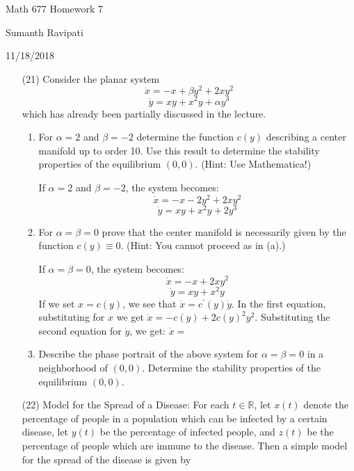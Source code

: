 \documentclass[12pt,letterpaper,reqno]{amsart}
\newcommand{\R}{\mathbb R}
\begin{document}
\thispagestyle{empty}
\centerline{\Large Math 677 Homework 7}
\centerline{Sumanth Ravipati}
\centerline{11/18/2018}
\vspace{.25in}

\begin{enumerate}
\item[(21)] Consider the planar system
$$\dot{x} = -x + \beta y^2 + 2xy^2$$
$$\dot{y} = xy + x^2y + \alpha y^3$$
which has already been partially discussed in the lecture.

\begin{enumerate}
    \item For $\alpha = 2$ and $\beta = -2$ determine the function $c(y)$ describing a center manifold up to order 10. Use this result to determine the stability properties of the equilibrium $(0,0)$. (Hint: Use Mathematica!)
    \newline
    \begin{flushleft}
    If $\alpha = 2$ and $\beta = -2$, the system becomes: $$\dot{x} = -x - 2y^2 + 2xy^2$$
    $$\dot{y} = xy + x^2y + 2y^3$$
    \newline
    \end{flushleft}
    \item For $\alpha = \beta = 0$ prove that the center manifold is necessarily given by the function $c(y) \equiv 0$. (Hint: You cannot proceed as in (a).)
    \begin{flushleft}
    If $\alpha = \beta = 0$, the system becomes:
    $$\dot{x} = -x + 2xy^2$$
    $$\dot{y} = xy + x^2y$$
    If we set $x = c(y)$, we see that $\dot{x} = c^\prime(y)\dot{y}$. In the first equation, substituting for $x$ we get $\dot{x} = -c(y) + 2c(y)^2y^2$. Substituting the second equation for $\dot{y}$, we get: $\dot{x} = $
    \newline
    \end{flushleft}
    \item Describe the phase portrait of the above system for $\alpha = \beta = 0$ in a neighborhood of $(0,0)$. Determine the stability properties of the equilibrium $(0,0)$.
\end{enumerate}

\item[(22)] Model for the Spread of a Disease: For each $t \in \R$, let $x(t)$ denote the percentage of people in a population which can be infected by a certain disease, let $y(t)$ be the percentage of infected people, and $z(t)$ be the percentage of people which are immune to the disease. Then a simple model for the spread of the disease is given by


\end{enumerate}
\end{document}
